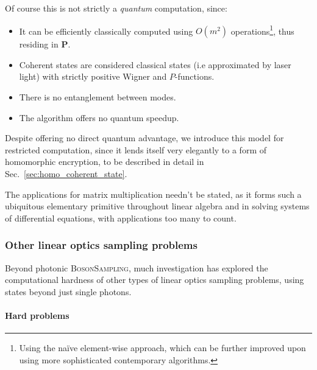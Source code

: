 Of course this is not strictly a \textit{quantum} computation, since:
\begin{itemize}
\item It can be efficiently classically computed using $O(m^2)$ operations\footnote{Using the na\"ive element-wise approach, which can be further improved upon using more sophisticated contemporary algorithms.}, thus residing in \textbf{P}.
\item Coherent states are considered classical states (i.e approximated by laser light) with strictly positive Wigner and $P$-functions.
\item There is no entanglement between modes.
\item The algorithm offers no quantum speedup.
\end{itemize}

Despite offering no direct quantum advantage, we introduce this model for restricted computation, since it lends itself very elegantly to a form of homomorphic encryption, to be described in detail in Sec.~\ref{sec:homo_coherent_state}.

The applications for matrix multiplication needn't be stated, as it forms such a ubiquitous elementary primitive throughout linear algebra and in solving systems of differential equations, with applications too many to count.

%
%

\subsubsection{Other linear optics sampling problems} \label{sec:other_LO_samp_probs} 

Beyond photonic \textsc{BosonSampling}, much investigation has explored the computational hardness of other types of linear optics sampling problems, using states beyond just single photons.

%
%

\paragraph{Hard problems}

